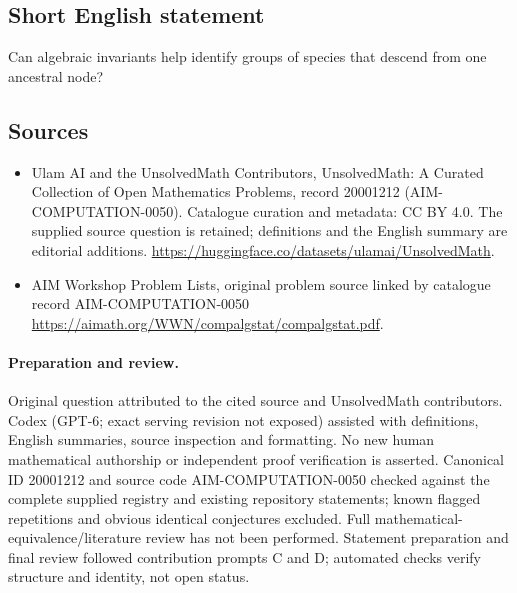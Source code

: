 \documentclass[11pt]{article}
\begin{document}
\subsection{Short English statement}
Can algebraic invariants help identify groups of species that descend from one ancestral node?
\subsection{Sources}
\begin{itemize}
\item[\hypertarget{source:20001212:1}{S1}] Ulam AI and the UnsolvedMath Contributors, UnsolvedMath: A Curated Collection of Open Mathematics Problems, record 20001212 (AIM-COMPUTATION-0050). Catalogue curation and metadata: CC BY 4.0. The supplied source question is retained; definitions and the English summary are editorial additions.
\url{https://huggingface.co/datasets/ulamai/UnsolvedMath}.
\item[\hypertarget{source:20001212:2}{S2}] AIM Workshop Problem Lists, original problem source linked by catalogue record AIM-COMPUTATION-0050
\url{https://aimath.org/WWN/compalgstat/compalgstat.pdf}.
\end{itemize}
\paragraph{Preparation and review.}
Original question attributed to the cited source and UnsolvedMath contributors. Codex (GPT-6; exact serving revision not exposed) assisted with definitions, English summaries, source inspection and formatting. No new human mathematical authorship or independent proof verification is asserted. Canonical ID 20001212 and source code AIM-COMPUTATION-0050 checked against the complete supplied registry and existing repository statements; known flagged repetitions and obvious identical conjectures excluded. Full mathematical-equivalence/literature review has not been performed. Statement preparation and final review followed contribution prompts C and D; automated checks verify structure and identity, not open status.
\label{end:20001212}
\end{document}
